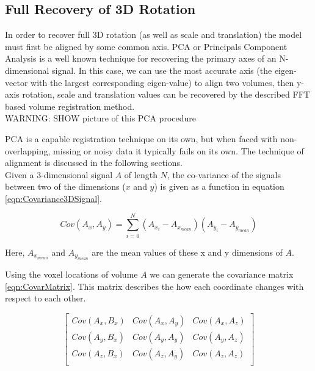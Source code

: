 \subsection{Full Recovery of 3D Rotation}

\label{FullRecovery3DSection}

In order to recover full 3D rotation (as well as scale and translation) the model must first be aligned by some common axis. PCA or Principals Component Analysis is a well known technique for recovering the primary axes of an N-dimensional signal. In this case, we can use the most accurate axis (the eigen-vector with the largest corresponding eigen-value) to align two volumes, then y-axis rotation, scale and translation values can be recovered by the described FFT based volume registration method. \\

WARNING: SHOW picture of this PCA procedure

PCA is a capable registration technique on its own, but when faced with non-overlapping, missing or noisy data it typically fails on its own. The technique of alignment is discussed in the following sections. \\

Given a 3-dimensional signal $A$ of length $N$, the co-variance of the signals between two of the dimensions ($x$ and $y$) is given as a function in equation \ref{eqn:Covariance3DSignal}.

\begin{equation} \label{eqn:Covariance3DSignal}
Cov(A_x,A_y) = \sum_{i=0}^{N}(A_{x_i} - A_{x_{mean}})(A_{y_i} - A_{y_{mean}})
\end{equation}

Here, $A_{x_{mean}}$ and $A_{y_{mean}}$ are the mean values of these x and y dimensions of $A$. 

Using the voxel locations of volume $A$ we can generate the covariance matrix \ref{eqn:CovarMatrix}. This matrix describes the how each coordinate changes with respect to each other.

\begin{equation} \label{eqn:CovarMatrix}
\left[
\begin{array}{ccc}
Cov(A_x, B_x) & Cov(A_x, A_y) & Cov(A_x, A_z) \\
Cov(A_y, B_x) & Cov(A_y, A_y) & Cov(A_y, A_z) \\
Cov(A_z, B_x) & Cov(A_z, A_y) & Cov(A_z, A_z) \\
\end{array}
\right]
\end{equation}

